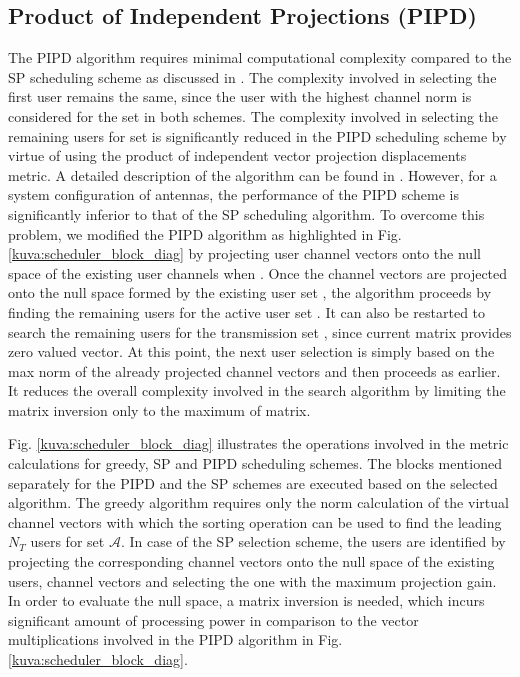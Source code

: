 \documentclass[conference,letterpaper]{./../../IEEE/IEEEtran}
\begin{document}
\subsection{Product of Independent Projections (PIPD)}
The PIPD algorithm requires minimal computational complexity compared to the SP scheduling scheme as discussed in \cite{venkatraman2014low}. The complexity involved in selecting the first user remains the same, since the user with the highest channel norm is considered for the set  in both schemes. The complexity involved in selecting the remaining users for set  is significantly reduced in the PIPD scheduling scheme by virtue of using the product of independent vector projection displacements metric. A detailed description of the algorithm can be found in \cite{venkatraman2014low}. However, for a system configuration of  antennas, the performance of the PIPD scheme is significantly inferior to that of the SP scheduling algorithm. To overcome this problem, we modified the PIPD algorithm as highlighted in Fig. \ref{kuva:scheduler_block_diag} by projecting user channel vectors onto the null space of the existing user channels when . Once the channel vectors are projected onto the null space formed by the existing user set , the algorithm proceeds by finding the remaining users for the active user set . It can also be restarted to search the remaining  users for the transmission set , since current  matrix provides zero valued vector. At this point, the next user selection is simply based on the max norm of the already projected channel vectors and then proceeds as earlier. It reduces the overall complexity involved in the search algorithm by limiting the matrix inversion only to the maximum of  matrix.

Fig. \ref{kuva:scheduler_block_diag} illustrates the operations involved in the metric calculations for greedy, SP and PIPD scheduling schemes. The blocks mentioned separately for the PIPD and the SP schemes are executed based on the selected algorithm. The greedy algorithm requires only the norm calculation of the virtual channel vectors with which the sorting operation can be used to find the leading $N_T$ users for set $\mathcal{A}$. In case of the SP selection scheme, the users are identified by projecting the corresponding channel vectors onto the null space of the existing users, channel vectors and selecting the one with the maximum projection gain. In order to evaluate the null space, a matrix inversion is needed, which incurs significant amount of processing power in comparison to the vector multiplications involved in the PIPD algorithm in Fig.\ref{kuva:scheduler_block_diag}.
\end{document}
